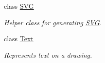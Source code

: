 \begin{DoxyCompactItemize}
class \hyperlink{classcom_1_1aarrelaakso_1_1drawl_1_1_s_v_g}{S\+VG}
\begin{DoxyCompactList}\small\item\em Helper class for generating \hyperlink{classcom_1_1aarrelaakso_1_1drawl_1_1_s_v_g}{S\+VG}. \end{DoxyCompactList}\item 
class \hyperlink{classcom_1_1aarrelaakso_1_1drawl_1_1_text}{Text}
\begin{DoxyCompactList}\small\item\em Represents text on a drawing. \end{DoxyCompactList}\end{DoxyCompactItemize}
